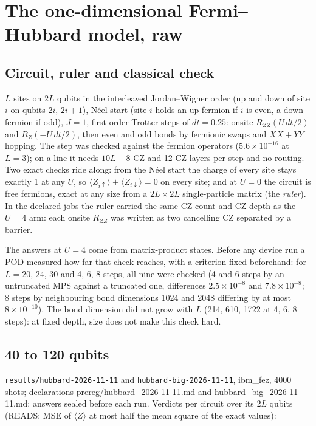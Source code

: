 
\section{The one-dimensional Fermi--Hubbard model, raw}\label{sec:hubbard}

\subsection{Circuit, ruler and classical check}
$L$ sites on $2L$ qubits in the interleaved Jordan--Wigner order (up and down of site $i$ on qubits $2i$, $2i+1$), N\'eel
start (site $i$ holds an up fermion if $i$ is even, a down fermion if odd), $J = 1$, first-order Trotter steps of
$dt = 0.25$: onsite $R_{ZZ}(U\,dt/2)$ and $R_Z(-U\,dt/2)$, then even and odd bonds by fermionic swaps and $XX+YY$
hopping. The step was checked against the fermion operators ($5.6\times10^{-16}$ at $L = 3$); on a line it needs
$10L-8$ CZ and 12 CZ layers per step and no routing. Two exact checks ride along: from the N\'eel start the charge of
every site stays exactly 1 at any $U$, so $\langle Z_{i\uparrow}\rangle + \langle Z_{i\downarrow}\rangle = 0$ on every
site; and at $U = 0$ the circuit is free fermions, exact at any size from a $2L\times2L$ single-particle matrix (the
\emph{ruler}). In the declared jobs the ruler carried the same CZ count and CZ depth as the $U = 4$ arm: each onsite
$R_{ZZ}$ was written as two cancelling CZ separated by a barrier.

The answers at $U = 4$ come from matrix-product states. Before any device run a POD measured how far that check
reaches, with a criterion fixed beforehand: for $L = 20$, 24, 30 and 4, 6, 8 steps, all nine were checked (4 and 6
steps by an untruncated MPS against a truncated one, differences $2.5\times10^{-8}$ and $7.8\times10^{-8}$; 8 steps by
neighbouring bond dimensions 1024 and 2048 differing by at most $8\times10^{-10}$). The bond dimension did not grow
with $L$ (214, 610, 1722 at 4, 6, 8 steps): at fixed depth, size does not make this check hard.

\subsection{40 to 120 qubits}
\texttt{results/hubbard-2026-11-11} and \texttt{hubbard-big-2026-11-11}, ibm\_fez, 4000 shots; declarations
prereg/hubbard\_2026-11-11.md and hubbard\_big\_2026-11-11.md; answers sealed before each run. Verdicts per circuit over
its $2L$ qubits (READS: MSE of $\langle Z\rangle$ at most half the mean square of the exact values):

